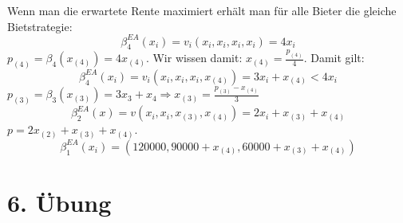 \documentclass[12pt]{extreport} %
\theoremstyle{named}
\theoremstyle{nnamed}
\theoremstyle{itshape}
\theoremstyle{normal}
\begin{document}
Wenn man die erwartete Rente maximiert erhält man für alle Bieter die gleiche Bietstrategie:
$$ \beta_{4}^{EA}(x_{i}) = v_{i}(x_{i}, x_{i}, x_{i}, x_{i}) = 4 x_{i} $$
$p_{(4)} = \beta_{4}(x_{(4)}) = 4 x_{(4)}$. Wir wissen damit: $x_{(4)} = \frac{p_{(4)}}{4}$. Damit gilt:
$$  \beta_{4}^{EA}(x_{i}) = v_{i}(x_{i}, x_{i}, x_{i}, x_{(4)}) = 3 x_{i} + x_{(4)} < 4 x_{i}  $$
$p_{(3)} = \beta_{3}(x_{(3)}) = 3x_{3} + x_{4} \Rightarrow x_{(3)} = \frac{p_{(3)} - x_{(4)}}{3}$
$$ \beta_{2}^{EA}(x) = v(x_{i}, x_{i}, x_{(3)}, x_{(4)}) = 2x_{i} + x_{(3)} + x_{(4)} $$
$p = 2x_{(2)} + x_{(3)} + x_{(4)}$.
$$ \beta_{1}^{EA}(x_{i}) =\left( 120000, 90000 + x_{(4)}, 60000 + x_{(3)} + x_{(4)} \right) $$

\section*{6. Übung}
\end{document}
